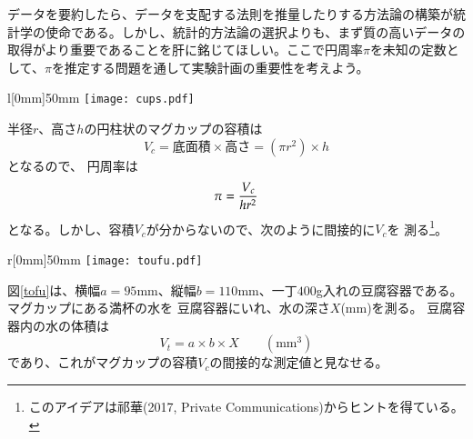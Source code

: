 \begin{teatime}
データを要約したら、データを支配する法則を推量したりする方法論の構築が統計学の使命である。しかし、統計的方法論の選択よりも、まず質の高いデータの取得がより重要であることを肝に銘じてほしい。ここで円周率$\pi$を未知の定数として、$\pi$を推定する問題を通して実験計画の重要性を考えよう。

\begin{wrapfigure}[11]{l}[0mm]{50mm} 
\vspace*{-\intextsep}
\centering
\texttt{[image: cups.pdf]}%
\caption{同じ高さのマグカップ\label{cup}}
\end{wrapfigure}

半径$r$、高さ$h$の円柱状のマグカップの容積は
$$
V_c = \mbox{底面積} \times \mbox{高さ} = (\pi r^2) \times h 
$$
となるので、
円周率は
\begin{equation}
\pi  = {V_c \over h r^2}
\label{eqn:pi}
\end{equation}
となる。しかし、容積$V_c$が分からないので、次のように間接的に$V_c$を
測る\footnote{このアイデアは祁華(2017, Private Communications)からヒントを得ている。}。

\begin{wrapfigure}[11]{r}[0mm]{50mm} 
\vspace*{-\intextsep}
\centering
\texttt{[image: toufu.pdf]}%
\caption{一丁$400$g入れの豆腐容器\label{tofu}}
\end{wrapfigure}

図\ref{tofu}は、横幅$a=95$mm、縦幅$b=110$mm、一丁$400$g入れの豆腐容器である。マグカップにある満杯の水を
豆腐容器にいれ、水の深さ$X$(mm)を測る。
豆腐容器内の水の体積は
$$
V_t = a\times b\times X \qquad (\mbox{mm}^3)
$$
であり、これがマグカップの容積$V_c$の間接的な測定値と見なせる。


\end{teatime}
